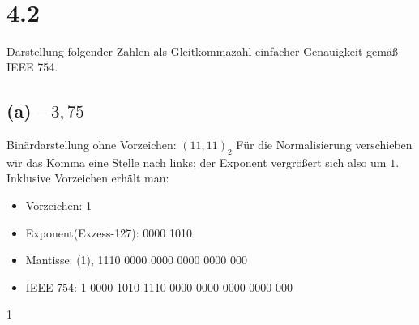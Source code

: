 \documentclass[11pt,a4paper]{article}
\begin{document}
\begin{align*}
\end{align*}

\section*{4.2}
Darstellung folgender Zahlen als Gleitkommazahl einfacher Genauigkeit gemäß IEEE 754.

\subsection*{(a) $-3,75$}
Binärdarstellung ohne Vorzeichen: $(11,11)_2$
Für die Normalisierung verschieben wir das Komma eine Stelle nach links; der Exponent vergrößert sich also um $1$.
Inklusive Vorzeichen erhält man:
\begin{itemize}
  \item Vorzeichen: 1
  \item Exponent(Exzess-127): 0000 1010
  \item Mantisse: (1), 1110 0000 0000 0000 0000 000
  \item IEEE 754: 1 0000 1010 1110 0000 0000 0000 0000 000
\end{itemize}
1
\end{document}
